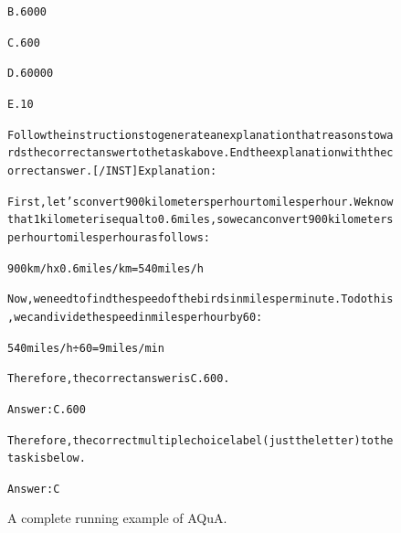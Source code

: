 \begin{figure}[t]
{{\begin{alltt}
B. 6000

C. 600

D. 60000

E. 10

Follow the instructions to generate an explanation that reasons towards the correct answer to the task above. End the explanation with the correct answer. [/INST] Explanation: 

First, let's convert 900 kilometers per hour to miles per hour. We know that 1 kilometer is equal to 0.6 miles, so we can convert 900 kilometers per hour to miles per hour as follows:

900 km/h x 0.6 miles/km = 540 miles/h

Now, we need to find the speed of the birds in miles per minute. To do this, we can divide the speed in miles per hour by 60:

540 miles/h ÷ 60 = 9 miles/min

Therefore, the correct answer is C. 600.

Answer: C. 600

Therefore, the correct multiple choice label (just the letter) to the task is below.

Answer: C
\end{alltt}
}}
\caption{A complete running example of AQuA.}
\label{fig:aqua_example}
\end{figure}

